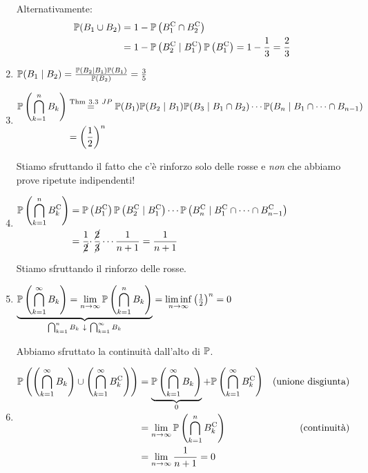 \begin{enumerate}
	Alternativamente:
	\begin{align*}
		\mathbb{P}(B_{1} \cup B_{2}) & =1-\mathbb{P}\left(B_{1}^{\mathrm{C}} \cap B_{2}^{\mathrm{C}}\right)\\
		 & =1-\mathbb{P}\left(B_{2}^{\mathrm{C}} \mid B_{1}^{\mathrm{C}}\right)\mathbb{P}\left(B_{1}^{\mathrm{C}}\right) =1-\frac{1}{3} =\frac{2}{3}
	\end{align*}
	\item $\mathbb{P}(B_{1} \mid B_{2}) =\frac{\mathbb{P}(B_{2} \mid B_{1})\mathbb{P}(B_{1})}{\mathbb{P}(B_{2})} =\frac{3}{5}$
	\item $
	\begin{aligned}
		\mathbb{P}\left(\bigcap\limits_{k=1}^{n} B_{k}\right) & \overset{\text{Thm} \ 3.3\ JP}{=}\mathbb{P}(B_{1})\mathbb{P}(B_{2} \mid B_{1})\mathbb{P}(B_{3} \mid B_{1} \cap B_{2}) \cdots \mathbb{P}(B_{n} \mid B_{1} \cap \cdots \cap B_{n-1})\\
		 & =\left(\frac{1}{2}\right)^{n}
	\end{aligned}$
	
	Stiamo sfruttando il fatto che c'è rinforzo solo delle rosse e \textit{non} che abbiamo prove ripetute indipendenti!
	\item $
	\begin{aligned}
		\mathbb{P}\left(\bigcap\limits_{k=1}^{n} B_{k}^{\mathrm{C}}\right) & =\mathbb{P}\left(B_{1}^{\mathrm{C}}\right)\mathbb{P}\left(B_{2}^{\mathrm{C}} \mid B_{1}^{\mathrm{C}}\right) \cdots \mathbb{P}\left(B_{n}^{\mathrm{C}} \mid B_{1}^{\mathrm{C}} \cap \cdots \cap B_{n-1}^{\mathrm{C}}\right)\\
		 & =\frac{1}{\cancel{2}} \cdotp \frac{\cancel{2}}{\cancel{3}} \cdots \frac{1}{n+1} =\frac{1}{n+1}
	\end{aligned}$

	Stiamo sfruttando il rinforzo delle rosse.
	\item $\underbrace{\mathbb{P}\left(\bigcap\limits_{k=1}^{\infty } B_{k}\right) =\lim\limits_{n\rightarrow \infty }\mathbb{P}\left(\bigcap\limits_{k=1}^{n} B_{k}\right)}_{\bigcap_{k=1}^{n} B_{k} \ \downarrow \ \bigcap_{k=1}^{\infty } B_{k}} =\liminf\limits_{n\rightarrow \infty }\left(\frac{1}{2}\right)^{n} =0$

	Abbiamo sfruttato la continuità dall'alto di $\mathbb{P}$.
	\item $
	\begin{aligned}
		\mathbb{P}\left(\left(\bigcap\limits_{k=1}^{\infty } B_{k}\right) \cup \left(\bigcap\limits_{k=1}^{\infty } B_{k}^{\mathrm{C}}\right)\right) & =\underbrace{\mathbb{P}\left(\bigcap\limits_{k=1}^{\infty } B_{k}\right)}_{0} +\mathbb{P}\left(\bigcap\limits_{k=1}^{\infty } B_{k}^{\mathrm{C}}\right) & \text{(unione disgiunta)}\\
		 & =\lim\limits_{n\rightarrow \infty }\mathbb{P}\left(\bigcap\limits_{k=1}^{n} B_{k}^{\mathrm{C}}\right) & \text{(continuità)}\\
		 & =\lim\limits_{n\rightarrow \infty }\frac{1}{n+1} =0 & 
	\end{aligned}$
\end{enumerate}

\Soluzione
